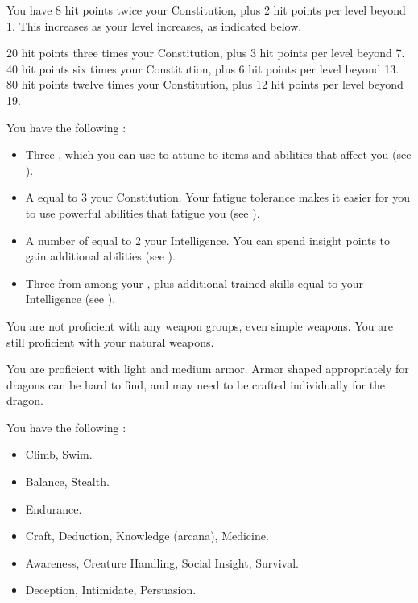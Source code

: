             You have 8 hit points \add twice your Constitution, plus 2 hit points per level beyond 1.
            This increases as your level increases, as indicated below.
            \begin{itemize}
                 20 hit points \add three times your Constitution, plus 3 hit points per level beyond 7.
                 40 hit points \add six times your Constitution, plus 6 hit points per level beyond 13.
                 80 hit points \add twelve times your Constitution, plus 12 hit points per level beyond 19.
            \end{itemize}

         You have the following :
        \begin{itemize}
            \item Three , which you can use to attune to items and abilities that affect you (see ).
            \item A  equal to 3 \add your Constitution.
                Your fatigue tolerance makes it easier for you to use powerful abilities that fatigue you (see ).
            \item A number of  equal to 2 \add your Intelligence.
                You can spend insight points to gain additional abilities (see ).
            \item Three  from among your , plus additional trained skills equal to your Intelligence (see ).
        \end{itemize}

        You are not proficient with any weapon groups, even simple weapons.
        You are still proficient with your natural weapons.

        You are proficient with light and medium armor.
        Armor shaped appropriately for dragons can be hard to find, and may need to be crafted individually for the dragon.

        You have the following :
        \begin{itemize}
            \item {} Climb, Swim.
            \item {} Balance, Stealth.
            \item {} Endurance.
            \item {} Craft, Deduction, Knowledge (arcana), Medicine.
            \item {} Awareness, Creature Handling, Social Insight, Survival.
            \item {} Deception, Intimidate, Persuasion.
        \end{itemize}

